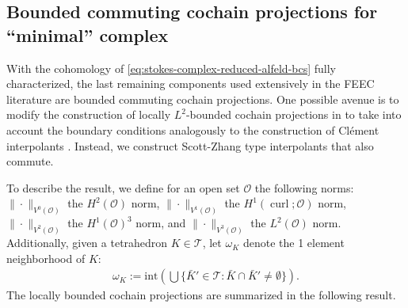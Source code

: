 \documentclass{mcom-l}
\theoremstyle{definition}
\theoremstyle{remark}
\numberwithin{equation}{section}
\DeclareMathOperator{\curl}{curl}
\newcommand{\mesh}[0]{\mathcal{T}}
\begin{document}
\subsection{Bounded commuting cochain projections for ``minimal'' complex}

With the cohomology of \cref{eq:stokes-complex-reduced-alfeld-bcs}
fully characterized, the last remaining components used extensively in the 
FEEC literature are bounded commuting cochain projections. One possible
avenue is to modify the construction of locally $L^2$-bounded cochain 
projections in \cite{HuLiangLin25} to take into account the boundary conditions
analogously to the construction of Cl\'{e}ment interpolants \cite{Clement75}.
Instead, we construct Scott-Zhang \cite{ScottZhang90} type interpolants
that also commute. 

To describe the result, we define for an open set $\mathcal{O}$
the following norms: $\| \cdot \|_{V^0(\mathcal{O})}$ the
$H^2(\mathcal{O})$ norm,  $\| \cdot \|_{V^1(\mathcal{O})}$ the 
$H^1(\curl; \mathcal{O})$ norm, $\| \cdot \|_{V^2(\mathcal{O})}$
the $H^1(\mathcal{O})^3$ norm, and $\| \cdot \|_{V^3(\mathcal{O})}$
the $L^2(\mathcal{O})$ norm. Additionally, given a tetrahedron $K \in \mesh$, 
let $\omega_K$ denote the 1 element neighborhood of $K$:
\begin{align*}
	\omega_K := \mathrm{int} \left( \bigcup 
	\{ \bar{K}' \in \mesh : \bar{K} \cap \bar{K}' \neq \emptyset \} \right).
\end{align*}
The locally bounded cochain projections are summarized in the following result.
\end{document}
